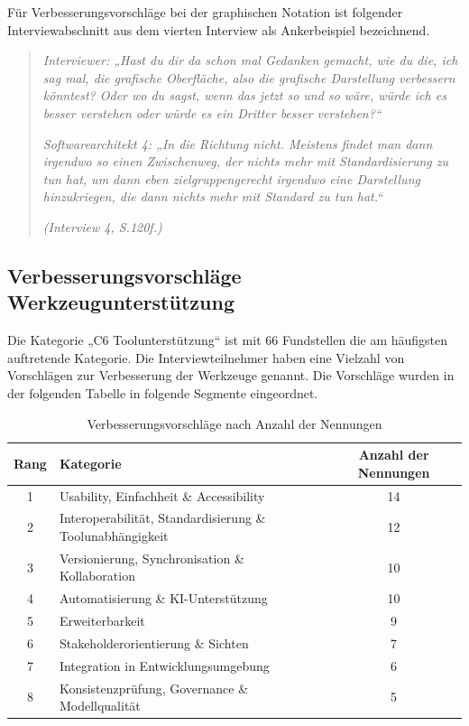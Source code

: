 Für Verbesserungsvorschläge bei der graphischen Notation ist folgender Interviewabschnitt aus dem vierten Interview als Ankerbeispiel bezeichnend.

\begin{quote}
\textit{Interviewer: „Hast du dir da schon mal Gedanken gemacht, wie du die, ich sag mal, die grafische Oberfläche, also die grafische Darstellung verbessern könntest? Oder wo du sagst, wenn das jetzt so und so wäre, würde ich es besser verstehen oder würde es ein Dritter besser verstehen?“}

\textit{Softwarearchitekt 4: „In die Richtung nicht. Meistens findet man dann irgendwo so einen Zwischenweg, der nichts mehr mit Standardisierung zu tun hat, um dann eben zielgruppengerecht irgendwo eine Darstellung hinzukriegen, die dann nichts mehr mit Standard zu tun hat.“}

\hfill \textit{(Interview 4, S.120f.)}
\end{quote}

\subsection{Verbesserungsvorschläge Werkzeugunterstützung}

Die Kategorie „C6 Toolunterstützung“ ist mit 66 Fundstellen die am häufigsten auftretende Kategorie. Die Interviewteilnehmer haben eine Vielzahl von Vorschlägen zur Verbesserung der Werkzeuge genannt. Die Vorschläge wurden in der folgenden Tabelle in folgende Segmente eingeordnet.

\begin{table}[h!]
\centering
\caption{ Verbesserungsvorschläge nach Anzahl der Nennungen}
\begin{tabular}{c l c}
\toprule
\textbf{Rang} & \textbf{Kategorie} & \textbf{Anzahl der Nennungen} \\
\midrule
1 & Usability, Einfachheit \& Accessibility & 14 \\
2 & Interoperabilität, Standardisierung \& Toolunabhängigkeit & 12 \\
3 & Versionierung, Synchronisation \& Kollaboration & 10 \\
4 & Automatisierung \& KI-Unterstützung & 10 \\
5 & Erweiterbarkeit & 9 \\
6 & Stakeholderorientierung \& Sichten & 7 \\
7 & Integration in Entwicklungsumgebung & 6 \\
8 & Konsistenzprüfung, Governance \& Modellqualität & 5 \\


\bottomrule
\end{tabular}

\label{tab:C6Verbesserungen}
\end{table}

